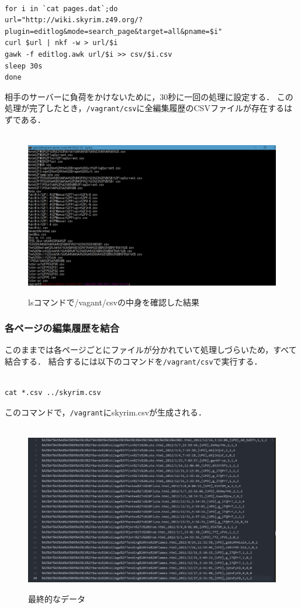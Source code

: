 \begin{verbatim}

for i in `cat pages.dat`;do
url="http://wiki.skyrim.z49.org/?plugin=editlog&mode=search_page&target=all&pname=$i"
curl $url | nkf -w > url/$i
gawk -f editlog.awk url/$i >> csv/$i.csv
sleep 30s
done

\end{verbatim}

相手のサーバーに負荷をかけないために，30秒に一回の処理に設定する．
この処理が完了したとき，\texttt{/vagrant/csv}に全編集履歴のCSVファイルが存在するはずである．

\begin{figure}[htbp]
\centering　
\includegraphics[width=13cm]{csvls.png}
\caption{lsコマンドで/vagant/csvの中身を確認した結果}
\end{figure}

\subsubsection{各ページの編集履歴を結合}

このままでは各ページごとにファイルが分かれていて処理しづらいため，すべて結合する．
結合するには以下のコマンドを\texttt{/vagrant/csv}で実行する．

\begin{verbatim}

cat *.csv ../skyrim.csv

\end{verbatim}

このコマンドで，\texttt{/vagrant}にskyrim.csvが生成される．



\begin{figure}[htbp]
\centering　
\includegraphics[width=13cm]{skyrimcsv.png}
\caption{最終的なデータ}
\end{figure}

